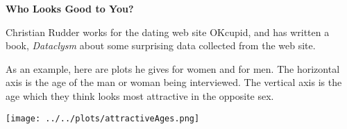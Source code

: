 \def\theTopic{Correlation/Slope }
\def\dayNum{17 }

\begin{center}

{\bf {\large Who Looks Good to You?}}
\end{center}


Christian Rudder works for the dating web site OKcupid, and has
written a book, {\it Dataclysm} about some surprising data 
collected from the web site.

As an example, here are plots he gives for women and for men.
The horizontal axis is the age of the man or woman being
interviewed. The vertical axis is the age which they think looks most
attractive in the opposite sex.\vspace{-.5cm}

\texttt{[image: ../../plots/attractiveAges.png]}

